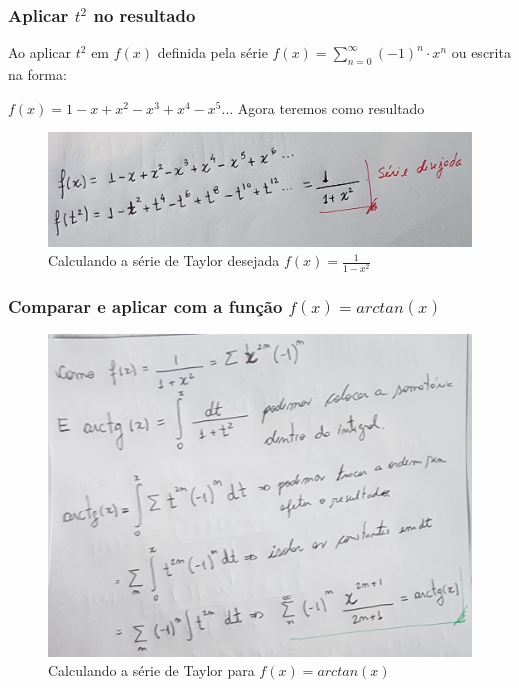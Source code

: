 \subsubsection{Aplicar $t^2$ no resultado}

Ao aplicar $t^2$ em $f(x)$ definida pela série $f(x) = \sum_{n=0}^{\infty} (-1)^n \cdot x^n $ ou escrita na forma:

$f(x) = 1 - x + x^2 - x^3 + x^4 - x^5 ... $  Agora teremos como resultado

\begin{figure}[H]
    \centering
    \includegraphics[width=1.0\textwidth]{imagens/exercicio4_parte2}
    \caption{Calculando a série de Taylor desejada $f(x) = \frac{1}{1 - x^2}$}
    \label{fig:exe4_parte2}
\end{figure}

\subsubsection{Comparar e aplicar com a função $f(x) = arctan(x)$}

\begin{figure}[H]
    \centering
    \includegraphics[width=1.0\textwidth]{imagens/exercicio4_parte3}
    \caption{Calculando a série de Taylor para $f(x) = arctan(x)$}
    \label{fig:exe4_parte3}
\end{figure}


